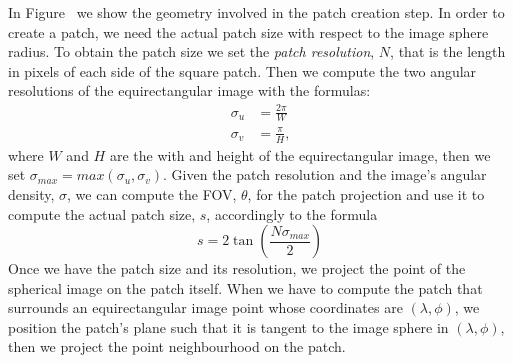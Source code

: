 In Figure~ we show the geometry involved in the
patch creation step. In order to create a patch, we need the actual patch size
with respect to the image sphere radius. To obtain the patch size we set the
\emph{patch resolution}, $N$, that is the length in pixels of each side of the
square patch. Then we compute the two angular
resolutions of the equirectangular image with the formulas:
%
\begin{subequations}
	\label{eq:angular_resolution}
	\begin{align}
	\sigma_u &= \frac{2\pi}{W} \\
	\sigma_v &= \frac{\pi}{H}	\text{,}
	\end{align}
\end{subequations}
%
\noindent where $W$ and $H$ are the with and height of the equirectangular
image, then we set $\sigma_{max} = max(\sigma_u, \sigma_v)$.
Given the patch resolution and the image's angular density, $\sigma$, we can
compute the FOV, $\theta$, for the patch projection and use it to compute
the actual patch size, $s$, accordingly to the formula
%
\begin{equation*}
s = 2\tan\left(\frac{N\sigma_{max}}{2}\right)
\end{equation*}
%
Once we have the patch size and its resolution, we project the point of the
spherical image on the patch itself.
When we have to compute the patch that surrounds an equirectangular image point
whose coordinates are $(\lambda,\phi)$, we position the patch's plane such that
it is tangent to the image sphere in $(\lambda, \phi)$, then we project
the point neighbourhood on the patch.

 

